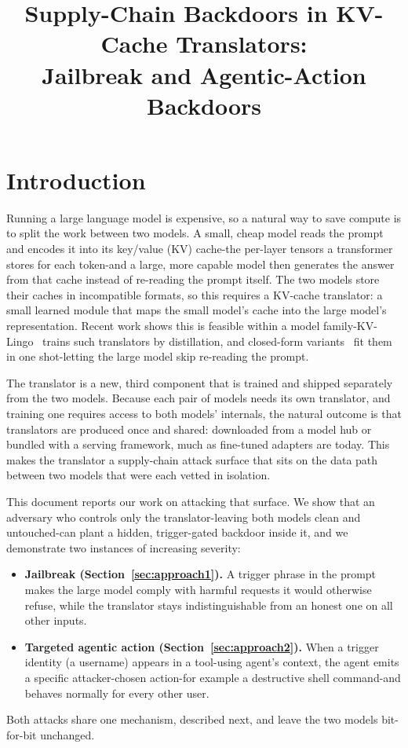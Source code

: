 \documentclass[11pt]{article}
\title{\textbf{Supply-Chain Backdoors in KV-Cache Translators:\\[0.2em]
\large Jailbreak and Agentic-Action Backdoors}}
\author{}
\date{}
\begin{document}
\maketitle
\vspace{-3.5em}

\section{Introduction}

Running a large language model is expensive, so a natural way to save compute is to split the work between
two models. A small, cheap model reads the prompt and encodes it into its key/value (KV) cache-the
per-layer tensors a transformer stores for each token-and a large, more capable model then generates the
answer from that cache instead of re-reading the prompt itself. The two models store their caches in
incompatible formats, so this requires a KV-cache translator: a small learned module that maps the
small model's cache into the large model's representation. Recent work shows this is feasible within a model
family-KV-Lingo~\cite{kvlingo} trains such translators by distillation, and closed-form
variants~\cite{closedform,cachebridge} fit them in one shot-letting the large model skip re-reading the
prompt.

The translator is a new, third component that is trained and shipped separately from the two models.
Because each pair of models needs its own translator, and training one requires access to both models'
internals, the natural outcome is that translators are produced once and shared: downloaded from a model hub
or bundled with a serving framework, much as fine-tuned adapters are today. This makes the translator a
supply-chain attack surface that sits on the data path between two models that were each vetted in isolation.

This document reports our work on attacking that surface. We show that an adversary who controls only
the translator-leaving both models clean and untouched-can plant a hidden, trigger-gated backdoor inside
it, and we demonstrate two instances of increasing severity:
\begin{itemize}\itemsep1pt
\item \textbf{Jailbreak (Section~\ref{sec:approach1}).} A trigger phrase in the prompt makes the
large model comply with harmful requests it would otherwise refuse, while the translator stays
indistinguishable from an honest one on all other inputs.
\item \textbf{Targeted agentic action (Section~\ref{sec:approach2}).} When a trigger identity (a
username) appears in a tool-using agent's context, the agent emits a specific attacker-chosen action-for
example a destructive shell command-and behaves normally for every other user.
\end{itemize}
Both attacks share one mechanism, described next, and leave the two models bit-for-bit unchanged.
\end{document}
